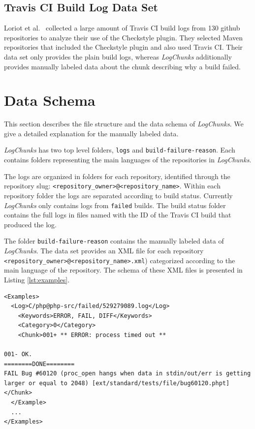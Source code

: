\documentclass[\myrootdir/main.tex]{subfiles}
\begin{document}
\subsection{Travis CI Build Log Data Set}
Loriot et al.~\cite{loriot2019dataset, loriot2019styler} collected a large amount of Travis CI build logs from 130 github repositories to analyze their use of the Checkstyle plugin.
They selected Maven repositories that included the Checkstyle plugin and also used Travis CI\@.
Their data set only provides the plain build logs, whereas \emph{LogChunks} additionally provides manually labeled data about the chunk describing why a build failed.

\section{Data Schema}
\label{sec:data-schema}
This section describes the file structure and the data schema of \emph{LogChunks}.
We give a detailed explanation for the manually labeled data.

\emph{LogChunks} has two top level folders, \texttt{logs} and \texttt{build-failure-reason}.
Each contains folders representing the main languages of the repositories in \emph{LogChunks}.

The logs are organized in folders for each repository, identified through the repository slug: \texttt{\textless repository\_owner\textgreater @\textless repository\_name\textgreater }.
Within each repository folder the logs are separated according to build status.
Currently \emph{LogChunks} only contains logs from \texttt{failed} builds.
The build status folder contains the full logs in files named with the ID of the Travis CI build that produced the log.

The folder \texttt{build-failure-reason} contains the manually labeled data of \emph{LogChunks}.
The data set provides an XML file for each repository \texttt{\textless repository\_owner\textgreater @\textless repository\_name\textgreater .xml}) categorized according to the main language of the repository.
The schema of these XML files is presented in Listing \ref{lst:examples}.

\begin{lstlisting}[caption={Example XML file from \emph{LogChunks}}, label=lst:examples, breaklines=true]
<Examples>
  <Log>C/php@php-src/failed/529279089.log</Log>
    <Keywords>ERROR, FAIL, DIFF</Keywords>
    <Category>0</Category>
    <Chunk>001+ ** ERROR: process timed out **

001- OK.
========DONE========
FAIL Bug #60120 (proc_open hangs when data in stdin/out/err is getting larger or equal to 2048) [ext/standard/tests/file/bug60120.phpt]</Chunk>
  </Example>
  ...
</Examples>
\end{lstlisting}
\end{document}
